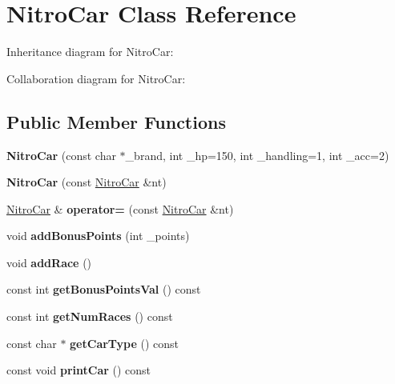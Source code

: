 \hypertarget{classNitroCar}{}\section{Nitro\+Car Class Reference}
\label{classNitroCar}


Inheritance diagram for Nitro\+Car\+:


Collaboration diagram for Nitro\+Car\+:
\subsection*{Public Member Functions}
\begin{DoxyCompactItemize}
\item 
{\bfseries Nitro\+Car} (const char $\ast$\+\_\+brand, int \+\_\+hp=150, int \+\_\+handling=1, int \+\_\+acc=2)\hypertarget{classNitroCar_a7a52134a0afa4f742e3c6b33c7c5adff}{}\label{classNitroCar_a7a52134a0afa4f742e3c6b33c7c5adff}

\item 
{\bfseries Nitro\+Car} (const \hyperlink{classNitroCar}{Nitro\+Car} \&nt)\hypertarget{classNitroCar_adf302043f3fcf5632132c43296103954}{}\label{classNitroCar_adf302043f3fcf5632132c43296103954}

\item 
\hyperlink{classNitroCar}{Nitro\+Car} \& {\bfseries operator=} (const \hyperlink{classNitroCar}{Nitro\+Car} \&nt)\hypertarget{classNitroCar_a88b20199c2b6d2cae4a64adba64b50ad}{}\label{classNitroCar_a88b20199c2b6d2cae4a64adba64b50ad}

\item 
void {\bfseries add\+Bonus\+Points} (int \+\_\+points)\hypertarget{classNitroCar_ac29ddfff9e721c08fbb3e4418db86921}{}\label{classNitroCar_ac29ddfff9e721c08fbb3e4418db86921}

\item 
void {\bfseries add\+Race} ()\hypertarget{classNitroCar_ac6753ff691df9215676230e58874475c}{}\label{classNitroCar_ac6753ff691df9215676230e58874475c}

\item 
const int {\bfseries get\+Bonus\+Points\+Val} () const \hypertarget{classNitroCar_a13385e1b01426f4e45f578c890e5c25c}{}\label{classNitroCar_a13385e1b01426f4e45f578c890e5c25c}

\item 
const int {\bfseries get\+Num\+Races} () const \hypertarget{classNitroCar_a44ea5a418fb13105a36f8de836d12b90}{}\label{classNitroCar_a44ea5a418fb13105a36f8de836d12b90}

\item 
const char $\ast$ {\bfseries get\+Car\+Type} () const \hypertarget{classNitroCar_a479135445562c5fee82604a0df4d7a19}{}\label{classNitroCar_a479135445562c5fee82604a0df4d7a19}

\item 
const void {\bfseries print\+Car} () const \hypertarget{classNitroCar_acee28240dea673b386a01f532090b004}{}\label{classNitroCar_acee28240dea673b386a01f532090b004}

\end{DoxyCompactItemize}
